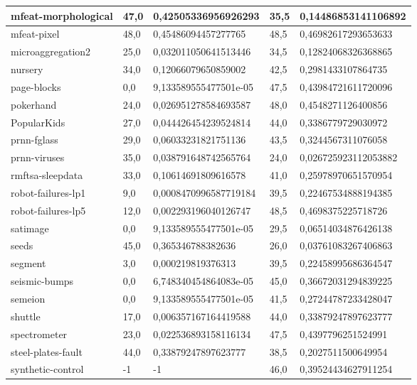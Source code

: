 \documentclass[times,specification,annotation]{itmo-student-thesis}
\begin{document}
\begin{center}
\begin{longtable}{ |m{3.4cm}|m{1.5cm}|m{4.7cm}|m{1.5cm}|m{4.7cm}| }
		\hline
		mfeat-morphological & 47,0 & 0,42505336956926293 & 35,5 & 0,14486853141106892 \\
		\hline
		mfeat-pixel & 48,0 & 0,45486094457277765 & 48,5 & 0,46982617293653633 \\
		\hline
		microaggregation2 & 25,0 & 0,032011050641513446 & 34,5 & 0,12824068326368865 \\
		\hline
		nursery & 34,0 & 0,12066079650859002 & 42,5 & 0,2981433107864735 \\
		\hline
		page-blocks & 0,0 & 9,133589555477501e-05 & 47,5 & 0,43984721611720096 \\
		\hline
		pokerhand & 24,0 & 0,026951278584693587 & 48,0 & 0,4548271126400856 \\
		\hline
		PopularKids & 27,0 & 0,044426454239524814 & 44,0 & 0,3386779729030972 \\
		\hline
		prnn-fglass & 29,0 & 0,06033231821751136 & 43,5 & 0,3244567311076058 \\
		\hline
		prnn-viruses & 35,0 & 0,038791648742565764 & 24,0 & 0,026725923112053882 \\
		\hline
		rmftsa-sleepdata & 33,0 & 0,10614691809616578 & 41,0 & 0,25978970651570954 \\
		\hline
		robot-failures-lp1 & 9,0 & 0,0008470996587719184 & 39,5 & 0,22467534888194385 \\
		\hline
		robot-failures-lp5 & 12,0 & 0,002293196040126747 & 48,5 & 0,4698375225718726 \\
		\hline
		satimage & 0,0 & 9,133589555477501e-05 & 29,5 & 0,06514034876426138 \\
		\hline
		seeds & 45,0 & 0,365346788382636 & 26,0 & 0,03761083267406863 \\
		\hline
		segment & 3,0 & 0,000219819376313 & 39,5 & 0,22458995686364547 \\
		\hline
		seismic-bumps & 0,0 & 6,748340454864083e-05 & 45,0 & 0,36672031294839225 \\
		\hline
		semeion & 0,0 & 9,133589555477501e-05 & 41,5 & 0,27244787233428047 \\
		\hline
		shuttle & 17,0 & 0,006357167164419588 & 44,0 & 0,33879247897623777 \\
		\hline
		spectrometer & 23,0 & 0,022536893158116134 & 47,5 & 0,4397796251524991 \\
		\hline
		steel-plates-fault & 44,0 & 0,33879247897623777 & 38,5 & 0,2027511500649954 \\
		\hline
		synthetic-control & -1 & -1 & 46,0 & 0,39524434627911254 \\

\end{longtable}
\end{center}
\end{document}
